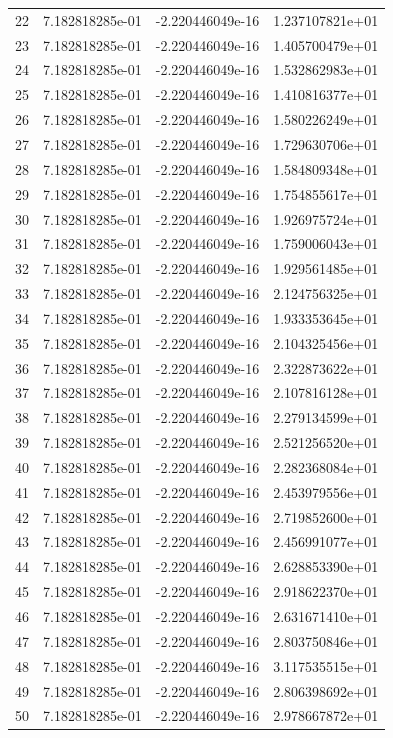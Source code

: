 \documentclass{article}
\begin{document}
\begin{table}[htb]
\begin{tabular}{c c c c}
22 & 7.182818285e-01 & -2.220446049e-16 & 1.237107821e+01 \\
23 & 7.182818285e-01 & -2.220446049e-16 & 1.405700479e+01 \\
24 & 7.182818285e-01 & -2.220446049e-16 & 1.532862983e+01 \\
25 & 7.182818285e-01 & -2.220446049e-16 & 1.410816377e+01 \\
26 & 7.182818285e-01 & -2.220446049e-16 & 1.580226249e+01 \\
27 & 7.182818285e-01 & -2.220446049e-16 & 1.729630706e+01 \\
28 & 7.182818285e-01 & -2.220446049e-16 & 1.584809348e+01 \\
29 & 7.182818285e-01 & -2.220446049e-16 & 1.754855617e+01 \\
30 & 7.182818285e-01 & -2.220446049e-16 & 1.926975724e+01 \\
31 & 7.182818285e-01 & -2.220446049e-16 & 1.759006043e+01 \\
32 & 7.182818285e-01 & -2.220446049e-16 & 1.929561485e+01 \\
33 & 7.182818285e-01 & -2.220446049e-16 & 2.124756325e+01 \\
34 & 7.182818285e-01 & -2.220446049e-16 & 1.933353645e+01 \\
35 & 7.182818285e-01 & -2.220446049e-16 & 2.104325456e+01 \\
36 & 7.182818285e-01 & -2.220446049e-16 & 2.322873622e+01 \\
37 & 7.182818285e-01 & -2.220446049e-16 & 2.107816128e+01 \\
38 & 7.182818285e-01 & -2.220446049e-16 & 2.279134599e+01 \\
39 & 7.182818285e-01 & -2.220446049e-16 & 2.521256520e+01 \\
40 & 7.182818285e-01 & -2.220446049e-16 & 2.282368084e+01 \\
41 & 7.182818285e-01 & -2.220446049e-16 & 2.453979556e+01 \\
42 & 7.182818285e-01 & -2.220446049e-16 & 2.719852600e+01 \\
43 & 7.182818285e-01 & -2.220446049e-16 & 2.456991077e+01 \\
44 & 7.182818285e-01 & -2.220446049e-16 & 2.628853390e+01 \\
45 & 7.182818285e-01 & -2.220446049e-16 & 2.918622370e+01 \\
46 & 7.182818285e-01 & -2.220446049e-16 & 2.631671410e+01 \\
47 & 7.182818285e-01 & -2.220446049e-16 & 2.803750846e+01 \\
48 & 7.182818285e-01 & -2.220446049e-16 & 3.117535515e+01 \\
49 & 7.182818285e-01 & -2.220446049e-16 & 2.806398692e+01 \\
50 & 7.182818285e-01 & -2.220446049e-16 & 2.978667872e+01 \\\hline %
\end{tabular}
\end{table}
\end{document}
